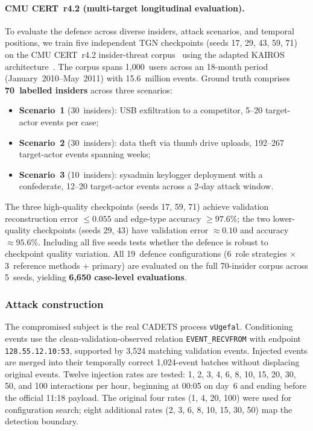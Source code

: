 \documentclass[10pt,twocolumn]{article}
\begin{document}
\paragraph{CMU CERT~r4.2 (multi-target longitudinal evaluation).}
To evaluate the defence across diverse insiders, attack scenarios, and
temporal positions, we train five independent TGN checkpoints (seeds 17,
29, 43, 59, 71) on the CMU CERT~r4.2 insider-threat
corpus~\cite{lindauer2020cert} using the adapted KAIROS
architecture~\cite{cheng2024kairos}.  The corpus spans 1,000~users across
an 18-month period (January~2010--May~2011) with 15.6~million events.
Ground truth comprises \textbf{70~labelled insiders} across three scenarios:
\begin{itemize}
  \item \textbf{Scenario~1} (30~insiders): USB exfiltration to a
    competitor, 5--20 target-actor events per case;
  \item \textbf{Scenario~2} (30~insiders): data theft via thumb drive
    uploads, 192--267 target-actor events spanning weeks;
  \item \textbf{Scenario~3} (10~insiders): sysadmin keylogger
    deployment with a confederate, 12--20 target-actor events across a
    2-day attack window.
\end{itemize}
The three high-quality checkpoints (seeds 17, 59, 71) achieve validation
reconstruction error $\leq 0.055$ and edge-type accuracy $\geq 97.6\%$;
the two lower-quality checkpoints (seeds 29, 43) have validation error
$\approx 0.10$ and accuracy $\approx 95.6\%$.  Including all five seeds
tests whether the defence is robust to checkpoint quality variation.
All 19~defence configurations (6~role strategies $\times$ 3~reference
methods $+$ primary) are evaluated on the full 70-insider corpus across
5~seeds, yielding \textbf{6,650 case-level evaluations}.

\subsubsection{Attack construction}

The compromised subject is the real CADETS process \texttt{vUgefal}.
Conditioning events use the clean-validation-observed relation
\texttt{EVENT\_RECVFROM} with endpoint \texttt{128.55.12.10:53}, supported
by 3,524 matching validation events.  Injected events are merged into their
temporally correct 1,024-event batches without displacing original events.
Twelve injection rates are tested: 1, 2, 3, 4, 6, 8, 10, 15, 20, 30, 50,
and 100 interactions per hour, beginning at 00:05 on day~6 and ending
before the official 11:18 payload.  The original four rates (1, 4, 20, 100)
were used for configuration search; eight additional rates (2, 3, 6, 8, 10,
15, 30, 50) map the detection boundary.
\end{document}
